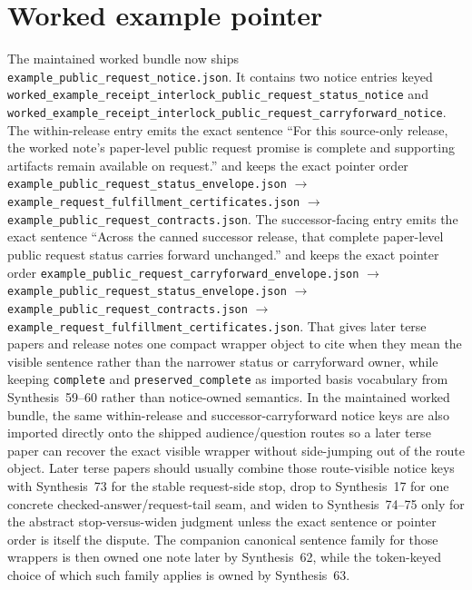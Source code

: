 \documentclass[11pt]{article}
\begin{document}
\section{Worked example pointer}
The maintained worked bundle now ships \nolinkurl{example_public_request_notice.json}.\cite{series:workedexample}
It contains two notice entries keyed \nolinkurl{worked_example_receipt_interlock_public_request_status_notice} and \nolinkurl{worked_example_receipt_interlock_public_request_carryforward_notice}.
The within-release entry emits the exact sentence ``For this source-only release, the worked note's paper-level public request promise is complete and supporting artifacts remain available on request.'' and keeps the exact pointer order
\nolinkurl{example_public_request_status_envelope.json} $\rightarrow$ \nolinkurl{example_request_fulfillment_certificates.json} $\rightarrow$ \nolinkurl{example_public_request_contracts.json}.
The successor-facing entry emits the exact sentence ``Across the canned successor release, that complete paper-level public request status carries forward unchanged.'' and keeps the exact pointer order
\nolinkurl{example_public_request_carryforward_envelope.json} $\rightarrow$ \nolinkurl{example_public_request_status_envelope.json} $\rightarrow$ \nolinkurl{example_public_request_contracts.json} $\rightarrow$ \nolinkurl{example_request_fulfillment_certificates.json}.
That gives later terse papers and release notes one compact wrapper object to cite when they mean the visible sentence rather than the narrower status or carryforward owner, while keeping \nolinkurl{complete} and \nolinkurl{preserved_complete} as imported basis vocabulary from Synthesis~59--60 rather than notice-owned semantics.
In the maintained worked bundle, the same within-release and successor-carryforward notice keys are also imported directly onto the shipped audience/question routes so a later terse paper can recover the exact visible wrapper without side-jumping out of the route object. Later terse papers should usually combine those route-visible notice keys with Synthesis~73 for the stable request-side stop, drop to Synthesis~17 for one concrete checked-answer/request-tail seam, and widen to Synthesis~74--75 only for the abstract stop-versus-widen judgment unless the exact sentence or pointer order is itself the dispute.
The companion canonical sentence family for those wrappers is then owned one note later by Synthesis~62, while the token-keyed choice of which such family applies is owned by Synthesis~63.\cite{series:publicrequestnoticenormalforms,series:publicrequestnoticeselections,series:publicrequestresponsepacketrefreshresponsepacketclosureverdicts,series:pairedterminalcitationdiscipline,series:pairedterminalcutoverrule}
\end{document}
